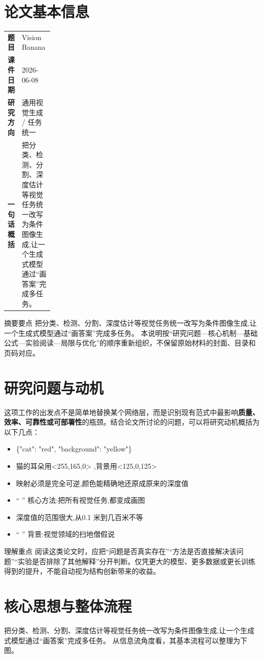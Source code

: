 \documentclass[UTF8,11pt,a4paper]{ctexart}
\newcommand{\term}[1]{\textbf{\textcolor{mainblue}{#1}}}
\begin{document}
\section{论文基本信息}
\begin{center}
\begin{tabularx}{0.94\linewidth}{>{\bfseries}p{0.18\linewidth}X}
\toprule
题目 & Vision Banana\\
课件日期 & 2026-06-08\\
研究方向 & 通用视觉生成 / 任务统一\\
一句话概括 & 把分类、检测、分割、深度估计等视觉任务统一改写为条件图像生成,让一个生成式模型通过“画答案”完成多任务。\\
\bottomrule
\end{tabularx}
\end{center}

\begin{infobox}{摘要要点}
把分类、检测、分割、深度估计等视觉任务统一改写为条件图像生成,让一个生成式模型通过“画答案”完成多任务。 本说明按“研究问题—核心机制—基础公式—实验阅读—局限与优化”的顺序重新组织，不保留原始材料的封面、目录和页码对应。
\end{infobox}

\section{研究问题与动机}
这项工作的出发点不是简单地替换某个网络层，而是识别现有范式中最影响\term{质量、效率、可靠性或可部署性}的瓶颈。结合论文所讨论的问题，可以将研究动机概括为以下几点：
\begin{itemize}
\item \{"cat": "red", "background": "yellow"\}
\item 猫的耳朵用<255,165,0> ,背景用<125,0,125>
\item 映射必须是完全可逆,颜色能精确地还原成原来的深度值
\item “ ” 核心方法:把所有视觉任务,都变成画图
\item 深度值的范围很大,从0.1 米到几百米不等
\item “ ” 背景:视觉领域的扫地僧假说
\end{itemize}

\begin{notebox}{理解重点}
阅读这类论文时，应把“问题是否真实存在”“方法是否直接解决该问题”“实验是否排除了其他解释”分开判断。仅凭更大的模型、更多数据或更长训练得到的提升，不能自动视为结构创新带来的收益。
\end{notebox}

\section{核心思想与整体流程}
把分类、检测、分割、深度估计等视觉任务统一改写为条件图像生成,让一个生成式模型通过“画答案”完成多任务。 从信息流角度看，其基本流程可以整理为下图。
\end{document}
